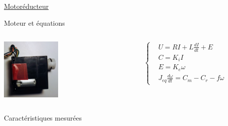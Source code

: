 \documentclass[french, handout]{beamer}
\begin{document}
        \begin{frame}{\hyperlink{details_moteur}{Motoréducteur}}
        \label{pres_moteur}
            \vspace{-0.2cm}
            \begin{block}{Moteur et équations}
                \begin{columns}[c]
                    \begin{column}{3 cm}
                        \includegraphics[width=2.9cm]{motoreducteur_ferme.jpg}
                    \end{column}
                    \hspace{-0.3cm}
                    \begin{column}{7 cm}
                        \begin{tcolorbox}[colback=red!5!white, colframe=red!75!black, title=Équations du MCC]
                            {\footnotesize \[ \left\{
                                    \begin{aligned}
                                    &U=RI+L\frac{dI}{dt}+E\\
                                    &C=K_{i}I\\
                                    &E=K_{e}\omega\\
                                    &J_{eq}\frac{d\omega}{dt}=C_{m}-C_{r}-f\omega
                                    \end{aligned}
                                    \right. \]}
                        \end{tcolorbox}
                    \end{column}
                \end{columns}
            \end{block}
            \vspace{-0.1cm}
            \begin{block}{Caractéristiques mesurées}
                \centering
                \begin{columns}[c]
                \begin{column}{3 cm}
                    \vspace{-.5cm}
                    \begin{figure}[htbp]

\end{figure}
\end{column}
\end{columns}
\end{block}
\end{frame}
\end{document}
